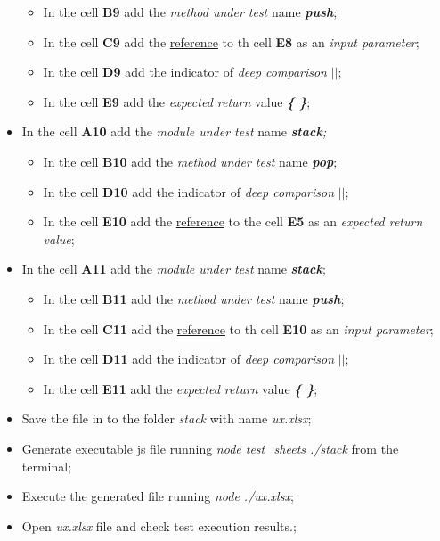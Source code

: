 \begin{itemize}
	\begin{itemize}
		\item In the cell \textbf{B9} add the \textit{method under test} name \textit{\textbf{push}};
		\item In the cell \textbf{C9} add the \underline{reference} to th cell \textbf{E8} as an \textit{input parameter};
		\item In the cell \textbf{D9} add the indicator of\textit{ deep comparison}\textit{ \textbf{$||$}};
		\item In the cell \textbf{E9} add the \textit{expected return} value\textit{ \textbf{ \{ \}}};
	\end{itemize}
%	
	\item In the cell \textbf{A10} add the \textit{module under test} name\textit{\textbf{ stack};}
	\begin{itemize}
		\item In the cell \textbf{B10} add the \textit{method under test} name\textit{ \textbf{ pop}};
		\item In the cell \textbf{D10} add the indicator of \textit{ deep comparison}\textit{ \textbf{$||$}};
		\item In the cell \textbf{E10} add the \underline{reference} to the cell \textbf{E5} as an \textit{expected return value};
	\end{itemize}
%	
	\item In the cell \textbf{A11} add the \textit{module under test} name \textit{\textbf{stack}};
	\begin{itemize}
		\item In the cell \textbf{B11} add the \textit{method under test} name \textit{\textbf{push}};
		\item In the cell \textbf{C11} add the \underline{reference} to th cell \textbf{E10} as an\textit{ input parameter};
		\item In the cell \textbf{D11} add the indicator of \textit{deep comparison}\textit{ \textbf{$||$}};
		\item In the cell \textbf{E11} add the \textit{expected return} value \textit{\textbf{ \{ \}}};
	\end{itemize}
%	
	\item Save the file in to the folder \textit{stack} with name \textit{ux.xlsx};
%	
	\item Generate executable js file running \textit{node test\_sheets ./stack} from the terminal;
%	
	\item Execute the generated file running \textit{node ./ux.xlsx};
	
	\item Open \textit{ux.xlsx} file and check test execution results.;
\end{itemize}


